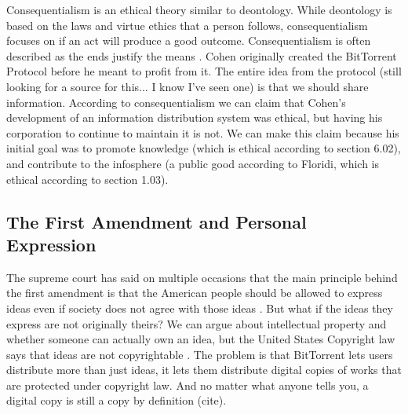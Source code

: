 \documentclass[11pt]{article}
\begin{document}

Consequentialism is an ethical theory similar to deontology. While deontology is based on the laws and virtue ethics that a person follows, consequentialism focuses on if an act will produce a good outcome. Consequentialism is often described as the ends justify the means \cite{cons}. Cohen originally created the BitTorrent Protocol before he meant to profit from it. The entire idea from the protocol (still looking for a source for this... I know I've seen one) is that we should share information. According to consequentialism we can claim that Cohen's development of an information distribution system was ethical, but having his corporation to continue to maintain it is not. We can make this claim because his initial goal was to promote knowledge (which is ethical according to section 6.02), and contribute to the infosphere (a public good according to Floridi\cite[4]{floridiInfo}, which is ethical according to section 1.03).

\subsection{The First Amendment and Personal Expression}

The supreme court has said on multiple occasions that the main principle behind the first amendment is that the American people should be allowed to express ideas even if society does not agree with those ideas \cite[51]{1988hustler}. But what if the ideas they express are not originally theirs? We can argue about intellectual property and whether someone can actually own an idea, but the United States Copyright law says that ideas are not copyrightable \cite{t17c1s103}. The problem is that BitTorrent lets users distribute more than just ideas, it lets them distribute digital copies of works that are protected under copyright law. And no matter what anyone tells you, a digital copy is still a copy by definition (cite).
\end{document}
